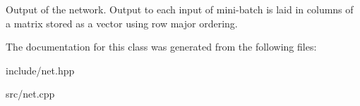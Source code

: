 Output of the network. Output to each input of mini-\/batch is laid in columns of a matrix stored as a vector using row major ordering. 

The documentation for this class was generated from the following files\+:\begin{DoxyCompactItemize}
\item 
include/net.\+hpp\item 
src/net.\+cpp\end{DoxyCompactItemize}
